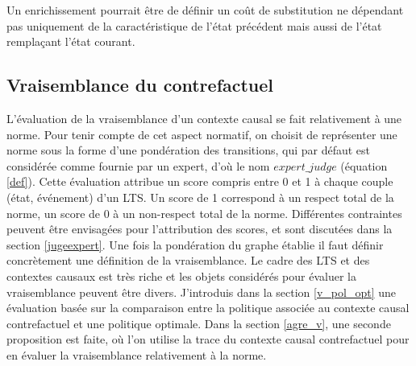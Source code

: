 
Un enrichissement pourrait être de définir un coût de substitution ne dépendant pas uniquement de la caractéristique de l'état précédent mais aussi de l'état remplaçant l'état courant.

 \subsection{Vraisemblance du contrefactuel}
 L'évaluation de la vraisemblance d'un contexte causal se fait relativement à une norme. Pour tenir compte de cet aspect normatif, on choisit de représenter une norme sous la forme d'une pondération des transitions, qui par défaut est considérée comme fournie par un expert, d'où le nom $expert\_judge$ (équation \ref{def}). Cette évaluation attribue un score compris entre 0 et 1 à chaque couple (état, événement) d'un LTS. Un score de 1 correspond à un respect total de la norme, un score de 0 à un non-respect total de la norme. Différentes contraintes peuvent être envisagées pour l'attribution des scores, et sont discutées dans la section \ref{jugeexpert}. Une fois la pondération du graphe établie il faut définir concrètement une définition de la vraisemblance. Le cadre des LTS et des contextes causaux est très riche et les objets considérés pour évaluer la vraisemblance peuvent être divers. J'introduis dans la section \ref{v_pol_opt} une évaluation basée sur la comparaison entre la politique associée au contexte causal contrefactuel et une politique optimale. Dans la section \ref{agre_v}, une seconde proposition est faite, où l'on utilise la trace du contexte causal contrefactuel pour en évaluer la vraisemblance relativement à la norme. 
 
